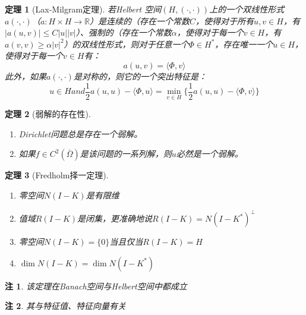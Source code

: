 \documentclass{article}                     %
\numberwithin{equation}{section}            %
\numberwithin{figure}{section}              %
\numberwithin{table}{section}               %
\newtheorem{theorem}{\indent 定理}[section] %
\newtheorem{remark}{\indent 注}[section]
\begin{document}
\begin{theorem}[Lax-Milgram定理]
    若Helbert 空间$(H,(\cdot ,\cdot ))$上的一个双线性形式$a(\cdot ,\cdot )$（$a:H\times H\to \mathbb{R} $）是连续的（存在一个常数$C$，使得对于所有$u,v\in H$，有$|a(u,v)|\le C|u||v|$）、强制的（存在一个常数$\alpha$，使得对于每一个$v\in H$，有$a(v,v)\ge \alpha|v|^2$）的双线性形式，则对于任意一个$\varPhi \in H^{\ast}$，存在唯一一个$u\in H$，使得对于每一个$v\in H$有：
    $$a(u,v)=\langle \varPhi ,v\rangle $$
    此外，如果$a(\cdot ,\cdot )$是对称的，则它的一个突出特征是：
    $$u\in H and \frac{1}{2}a(u,u)-\langle \varPhi ,u\rangle =\min_{v\in H}\{\frac{1}{2}a(u,u)-\langle \varPhi ,v\rangle\}$$
\end{theorem}










\begin{theorem}[弱解的存在性]
    \begin{enumerate}
        \item Dirichlet问题总是存在一个弱解。
        \item 如果$f\in C^2(\bar{\Omega})$是该问题的一系列解，则$u$必然是一个弱解。
    \end{enumerate}
\end{theorem}










\begin{theorem}[Fredholm择一定理]
    \begin{enumerate}
        \item 零空间$N(I-K)$是有限维
        \item 值域$R(I-K)$是闭集，更准确地说$R(I-K)=N(I-K^{\ast})^{\bot }$
        \item 零空间$N(I-K)=\{0\}$当且仅当$R(I-K)=H$
        \item $\dim N(I-K)=\dim N(I-K^{\ast})$
    \end{enumerate}
\end{theorem}
\begin{remark}
    该定理在Banach空间与Helbert空间中都成立
\end{remark}
\begin{remark}
    其与特征值、特征向量有关
\end{remark}
\end{document}
